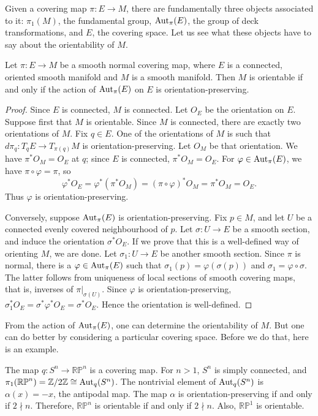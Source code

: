\documentclass[11pt,a4paper]{article}
\begin{document}
Given a covering map $\pi\colon E\to M$, there are fundamentally three
objects associated to it: $\pi_1(M)$, the fundamental group,
$\operatorname{Aut}_\pi(E)$, the group of deck transformations, and $E$, the covering space.
Let us see what these objects have to say about the orientability of $M$.
\setcounter{theorem}{13}\begin{theorem}
\label{thm:m4-deck-orientation}
Let $\pi\colon E\to M$ be a smooth normal covering map, where $E$ is a
connected, oriented smooth manifold and $M$ is a smooth manifold.
Then $M$ is orientable if and only if the action of $\operatorname{Aut}_\pi(E)$ on $E$
is orientation-preserving.
\end{theorem}
\begin{proof}
Since $E$ is connected, $M$ is connected. Let $O_E$ be the orientation on $E$.
Suppose first that $M$ is orientable.
Since $M$ is connected, there are exactly two orientations of $M$.
Fix $q\in E$. One of the orientations of $M$ is such that
$d\pi_q\colon T_qE\to T_{\pi(q)}M$ is orientation-preserving.
Let $O_M$ be that orientation. We have $\pi^*O_M=O_E$ at $q$; since $E$
is connected, $\pi^*O_M=O_E$.
For $\varphi\in\operatorname{Aut}_\pi(E)$, we have $\pi\circ\varphi=\pi$, so
\[
 \varphi^*O_E=\varphi^*(\pi^*O_M)
 =(\pi\circ\varphi)^*O_M=\pi^*O_M=O_E.
\]
Thus $\varphi$ is orientation-preserving.

Conversely, suppose $\operatorname{Aut}_\pi(E)$ is orientation-preserving.
Fix $p\in M$, and let $U$ be a connected evenly covered neighbourhood of $p$.
Let $\sigma\colon U\to E$ be a smooth section, and induce the orientation
$\sigma^*O_E$. If we prove that this is a well-defined way of orienting
$M$, we are done. Let $\sigma_1\colon U\to E$ be another smooth section.
Since $\pi$ is normal, there is a $\varphi\in\operatorname{Aut}_\pi(E)$ such that
$\sigma_1(p)=\varphi(\sigma(p))$ and $\sigma_1=\varphi\circ\sigma$.
The latter follows from uniqueness of local sections of smooth covering
maps, that is, inverses of $\pi|_{\sigma(U)}$.
Since $\varphi$ is orientation-preserving,
$\sigma_1^*O_E=\sigma^*\varphi^*O_E=\sigma^*O_E$. Hence the orientation
is well-defined.
\end{proof}
From the action of $\operatorname{Aut}_\pi(E)$, one can
determine the orientability of $M$. But one can do better by considering
a particular covering space. Before we do that, here is an example.
\setcounter{example}{5}\begin{example}
The map $q\colon S^n\to\mathbb{RP}^n$ is a covering map.
For $n>1$, $S^n$ is simply connected, and
$\pi_1(\mathbb{RP}^n)=\mathbb Z/2\mathbb Z\cong\operatorname{Aut}_q(S^n)$.
The nontrivial element of $\operatorname{Aut}_q(S^n)$ is $\alpha(x)=-x$, the antipodal map.
The map $\alpha$ is orientation-preserving if and only if $2\nmid n$.
Therefore, $\mathbb{RP}^n$ is orientable if and only if $2\nmid n$.
Also, $\mathbb{RP}^1$ is orientable.
\end{example}
\end{document}
